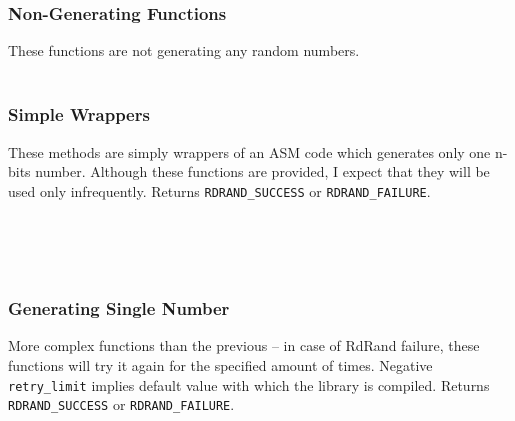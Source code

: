 \subsubsection{Non-Generating Functions}

These functions are not generating any random numbers.\\

\\

\subsubsection{Simple Wrappers}\label{subsec:api:simple-wrappers}
\par{
These methods are simply wrappers of an ASM code which generates only one n-bits number. Although these functions are provided, I expect that they will be used only infrequently. Returns {\tt RDRAND\_SUCCESS} or {\tt RDRAND\_FAILURE}.\\
}

\\

\\

\\

\subsubsection{Generating Single Number}\label{subsec:api:single-number}
\par{
More complex functions than the previous -- in case of RdRand failure, these functions will try it again for the specified amount of times. Negative {\tt retry\_limit} implies default value with which the library is compiled. Returns {\tt RDRAND\_SUCCESS} or {\tt RDRAND\_FAILURE}.\\
}

\\

